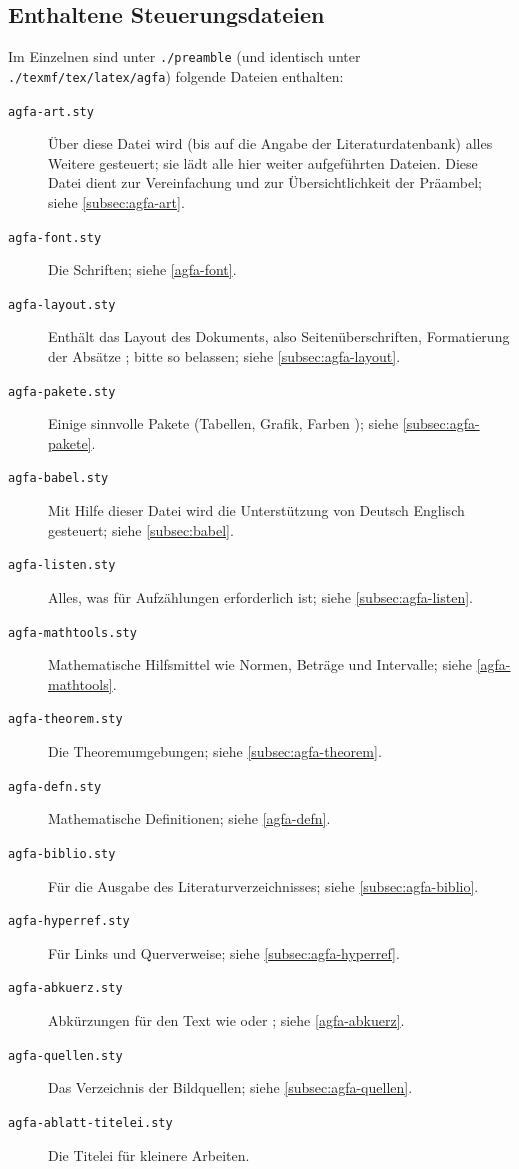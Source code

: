 \subsection{Enthaltene Steuerungsdateien}\label{subsec:dateieninzipfile}
%
Im Einzelnen sind unter \texttt{./preamble} (und identisch unter \texttt{./texmf/tex/latex/agfa}) folgende Dateien enthalten:

\begin{description}
\item[\texttt{agfa-art.sty}]
Über diese Datei wird (bis auf die Angabe der Literaturdatenbank) alles Weitere gesteuert; sie lädt alle hier weiter aufgeführten Dateien.
Diese Datei dient zur Vereinfachung und zur Übersichtlichkeit der Präambel; siehe \vref{subsec:agfa-art}.

\item[\texttt{agfa-font.sty}]
Die Schriften; siehe \vref{agfa-font}.

\item[\texttt{agfa-layout.sty}]
Enthält das Layout des Dokuments, also Seitenüberschriften, Formatierung der Absätze \etc; bitte so belassen; siehe \vref{subsec:agfa-layout}.

\item[\texttt{agfa-pakete.sty}]
Einige sinnvolle Pakete (Tabellen, Grafik, Farben \etc); siehe \vref{subsec:agfa-pakete}.

\item[\texttt{agfa-babel.sty}]
Mit Hilfe dieser Datei wird die Unterstützung von Deutsch \bzw Englisch gesteuert; siehe \vref{subsec:babel}.

\item[\texttt{agfa-listen.sty}]
Alles, was für Aufzählungen erforderlich ist; siehe \vref{subsec:agfa-listen}.

\item[\texttt{agfa-mathtools.sty}]
Mathematische Hilfsmittel wie Normen, Beträge und Intervalle; siehe \vref{agfa-mathtools}.

\item[\texttt{agfa-theorem.sty}]
Die Theoremumgebungen; siehe \vref{subsec:agfa-theorem}.

\item[\texttt{agfa-defn.sty}]
Mathematische Definitionen; siehe \vref{agfa-defn}.

\item[\texttt{agfa-biblio.sty}]
Für die Ausgabe des Literaturverzeichnisses; siehe \vref{subsec:agfa-biblio}.

\item[\texttt{agfa-hyperref.sty}]
Für Links und Querverweise; siehe \vref{subsec:agfa-hyperref}.

\item[\texttt{agfa-abkuerz.sty}]
Abkürzungen für den Text wie \zB oder \dh; siehe \vref{agfa-abkuerz}.

\item[\texttt{agfa-quellen.sty}]
Das Verzeichnis der Bildquellen; siehe \vref{subsec:agfa-quellen}.

\item[\texttt{agfa-ablatt-titelei.sty}]
Die Titelei für kleinere Arbeiten.

\end{description} 
%
